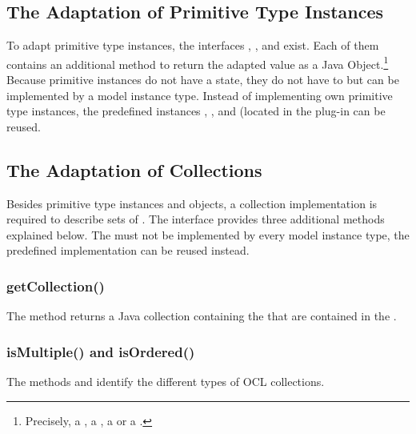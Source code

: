 \subsection{The Adaptation of Primitive Type Instances}

To adapt primitive type instances, the interfaces , ,  and  exist. Each of them contains an additional method to return the adapted value as a Java Object.\footnote{Precisely, a , a , a  or a .} Because primitive instances do not have a state, they do not have to but can be implemented by a model instance type. Instead of implementing own primitive type instances, the predefined instances , ,  and  (located in the plug-in  can be reused.


\subsection{The Adaptation of Collections}

Besides primitive type instances and objects, a collection implementation is required to describe sets of . The interface  provides three additional methods explained below. The  must not be implemented by every model instance type, the predefined implementation  can be reused instead.

\subsubsection{getCollection()}

The method  returns a Java collection containing the  that are contained in the .

\subsubsection{isMultiple() and isOrdered()}

The methods  and  identify the different types of \acs{OCL} collections.


